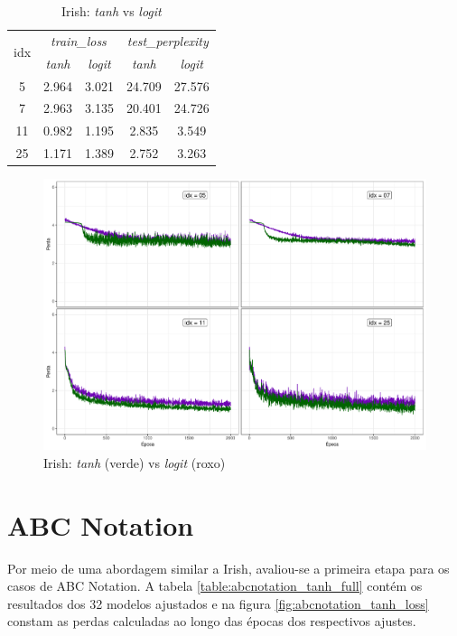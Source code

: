 \documentclass{automatextcc}
\begin{document}
\begin{table}[H]
    \caption{Irish: \textit{tanh} vs \textit{logit}} \label{tab:irish_tanh_vs_logit}
    \centering
    \begin{tabular}{c|cc|cc}
        \toprule
        \multirow{2}{*}{idx} &
        \multicolumn{2}{c|}{\textit{train\_loss}} &
        \multicolumn{2}{c}{\textit{test\_perplexity}} \\
        & {\textit{tanh}} & {\textit{logit}} & {\textit{tanh}} & {\textit{logit}} \\
        \midrule
        5 & 2.964 & 3.021 & 24.709 & 27.576 \\
        7 & 2.963 & 3.135 & 20.401 & 24.726 \\
        11 & 0.982 & 1.195 & 2.835 & 3.549 \\
        25 & 1.171 & 1.389 & 2.752 & 3.263 \\
    \bottomrule
  \end{tabular}
\end{table}

\begin{figure}[H]
    \centering
    \includegraphics[width=\textwidth]{irish_tanh_vs_logit.pdf}
    \caption{Irish: \textit{tanh} (verde) vs \textit{logit} (roxo)}
    \label{fig:irish_tanh_vs_logit}
\end{figure}



\section{ABC Notation}
Por meio de uma abordagem similar a Irish, avaliou-se a primeira etapa para os casos de ABC Notation. A tabela \ref{table:abcnotation_tanh_full} contém os resultados dos 32 modelos ajustados e na figura \ref{fig:abcnotation_tanh_loss} constam as perdas calculadas ao longo das épocas dos respectivos ajustes.
\end{document}
